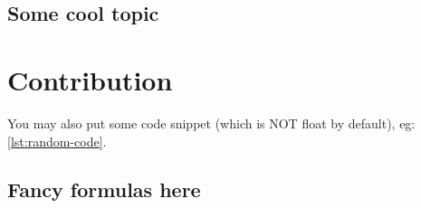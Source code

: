 \documentclass[12pt,a4paper,openright,twoside]{book}
\begin{document}
\section{Some cool topic}

\chapter{Contribution}

You may also put some code snippet (which is NOT float by default), eg: \cref{lst:random-code}.



\section{Fancy formulas here}


\backmatter

\nocite{*} %




\end{document}
